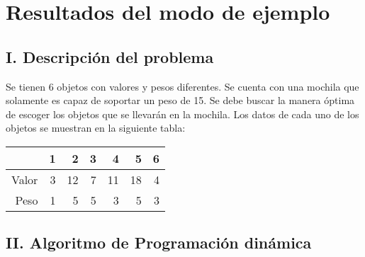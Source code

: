 \documentclass{article}
\begin{document}
\section*{Resultados del modo de ejemplo}
\subsection*{I. Descripción del problema}
Se tienen 6 objetos con valores y pesos diferentes. Se cuenta con una mochila que solamente es capaz de soportar un peso de 15. Se debe buscar la manera óptima de escoger los objetos que se llevarán en la mochila. Los datos de cada uno de los objetos se muestran en la siguiente tabla:\begin{table}[h]
\centering
\begin{tabular}{r|rrrrrr}
& 1 & 2 & 3 & 4 & 5 & 6 \\ \hline
Valor&3&12&7&11&18&4\\
Peso&1&5&5&3&5&3\\
\end{tabular}
\end{table}
\subsection*{II. Algoritmo de Programación dinámica}
\end{document}
